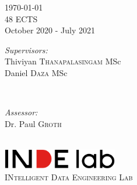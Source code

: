 \begin{titlepage}

{\Large \today}\\[1cm] %




48 ECTS\\ %

October 2020 - July 2021\\[1cm]%




\begin{minipage}[t]{0.7\textwidth}
    \begin{flushleft} \large
        \emph{Supervisors:} \\
        Thiviyan \textsc{Thanapalasingam} MSc \\
        Daniel \textsc{Daza} MSc \\
    \end{flushleft}
\end{minipage}

~

\begin{minipage}[t]{0.7\textwidth}
    \begin{flushright} \large
        \emph{Assessor:} \\
        Dr. Paul \textsc{Groth}\\
    \end{flushright}
\end{minipage}\\[2cm]






\includegraphics[width=5cm]{indelab_logo.png}\\ %

\textsc{\large INtelligent Data Engineering Lab}\\[1.0cm] %




\vfill %

\end{titlepage}

\restoregeometry